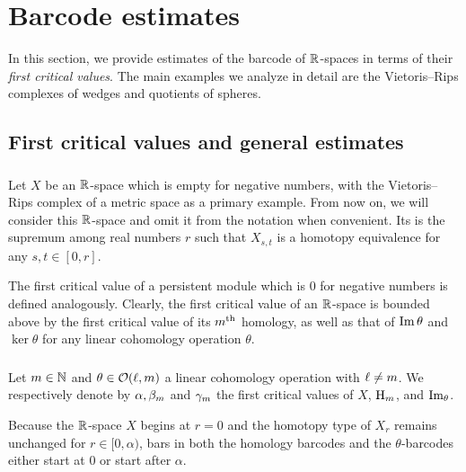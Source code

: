 
\section{Barcode estimates}\label{s:computations}

In this section, we provide estimates of the barcode of $\mathbb{R}$-spaces in terms of their \textit{first critical values}.
The main examples we analyze in detail are the Vietoris--Rips complexes of wedges and quotients of spheres.

\subsection{First critical values and general estimates}\label{sub:general_barcodes}

\subsubsection{}\label{subsub:first_critical_value}

Let $X$ be an $\mathbb{R}$-space which is empty for negative numbers, with the Vietoris--Rips complex of a metric space as a primary example.
From now on, we will consider this $\mathbb{R}$-space and omit it from the notation when convenient.
Its  is the supremum among real numbers $r$ such that $X_{s,t}$ is a homotopy equivalence for any $s,t \in [0,r]$.

The first critical value of a persistent module which is \(0\) for negative numbers is defined analogously.
Clearly, the first critical value of an $\mathbb{R}$-space is bounded above by the first critical value of its $m^{\mathrm{th}}$ homology, as well as that of \(\operatorname{Im}\theta\) and \(\ker\theta\) for any linear cohomology operation $\theta$.

\subsubsection{}\label{subsub:barcode_general}

Let \(m \in \mathbb{N}\) and \(\theta \in \mathcal{O}(\ell,m)\) a linear cohomology operation with \(\ell \neq m\).
We respectively denote by $\alpha, \beta_m$ and $\gamma_m$ the first critical values of $X$, \(\mathrm{H}_m\), and \(\operatorname{Im}_\theta\).

Because the $\mathbb{R}$-space $X$ begins at $r=0$ and the homotopy type of $X_r$ remains unchanged for $r\in [0,\alpha)$, bars in both the homology barcodes and the $\theta$-barcodes either start at $0$ or start after $\alpha$.

